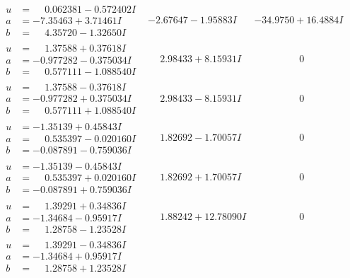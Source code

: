 \documentclass[1p]{elsarticle_modified}
\theoremstyle{definition}
\begin{document}
$$\begin{array}{c|c|c}
\begin{aligned}
u &= \phantom{-}0.062381 - 0.572402 I \\
a &= -7.35463 + 3.71461 I \\
b &= \phantom{-}4.35720 - 1.32650 I\end{aligned}
 & -2.67647 - 1.95883 I & -34.9750 + 16.4884 I \\ \hline\begin{aligned}
u &= \phantom{-}1.37588 + 0.37618 I \\
a &= -0.977282 - 0.375034 I \\
b &= \phantom{-}0.577111 - 1.088540 I\end{aligned}
 & \phantom{-}2.98433 + 8.15931 I & \phantom{-0.000000 } 0 \\ \hline\begin{aligned}
u &= \phantom{-}1.37588 - 0.37618 I \\
a &= -0.977282 + 0.375034 I \\
b &= \phantom{-}0.577111 + 1.088540 I\end{aligned}
 & \phantom{-}2.98433 - 8.15931 I & \phantom{-0.000000 } 0 \\ \hline\begin{aligned}
u &= -1.35139 + 0.45843 I \\
a &= \phantom{-}0.535397 - 0.020160 I \\
b &= -0.087891 - 0.759036 I\end{aligned}
 & \phantom{-}1.82692 - 1.70057 I & \phantom{-0.000000 } 0 \\ \hline\begin{aligned}
u &= -1.35139 - 0.45843 I \\
a &= \phantom{-}0.535397 + 0.020160 I \\
b &= -0.087891 + 0.759036 I\end{aligned}
 & \phantom{-}1.82692 + 1.70057 I & \phantom{-0.000000 } 0 \\ \hline\begin{aligned}
u &= \phantom{-}1.39291 + 0.34836 I \\
a &= -1.34684 - 0.95917 I \\
b &= \phantom{-}1.28758 - 1.23528 I\end{aligned}
 & \phantom{-}1.88242 + 12.78090 I & \phantom{-0.000000 } 0 \\ \hline\begin{aligned}
u &= \phantom{-}1.39291 - 0.34836 I \\
a &= -1.34684 + 0.95917 I \\
b &= \phantom{-}1.28758 + 1.23528 I\end{aligned}

\end{array}$$
\end{document}
